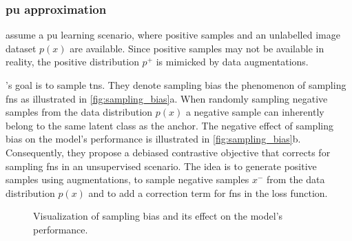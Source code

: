 \subsubsection{\ac{pu} approximation}\label{subsec:pu_approximation}

\citet{chuang_debiased_2020} assume a \ac{pu} learning scenario, 
where positive samples and an unlabelled image dataset $p(x)$ are available.
Since positive samples may not be available in reality, 
the positive distribution $p^+$ is mimicked by data augmentations.

\citeauthor{chuang_debiased_2020}'s goal is to sample \acp{tn}.
They denote sampling bias the phenomenon of sampling \acp{fn} as illustrated in \autoref{fig:sampling_bias}a.
When randomly sampling negative samples from the data distribution $p(x)$ 
a negative sample can inherently belong to the same latent class as the anchor.
The negative effect of sampling bias on the model's performance is illustrated in \autoref{fig:sampling_bias}b. %
Consequently, they propose a debiased contrastive objective that corrects for sampling \acp{fn} 
in an unsupervised scenario.
The idea is to generate positive samples using augmentations,
to sample negative samples $x^-$ from the data distribution $p(x)$
and to add a correction term for \acp{fn} in the loss function. 

\begin{figure}%
    \centering
    \qquad
    \caption{Visualization of sampling bias and its effect on the model's performance.}%
    \label{fig:sampling_bias}%
\end{figure}